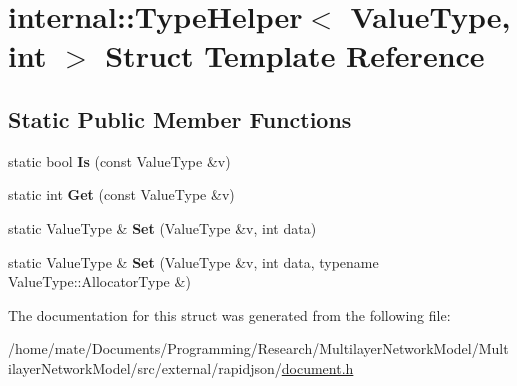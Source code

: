 \hypertarget{structinternal_1_1TypeHelper_3_01ValueType_00_01int_01_4}{}\section{internal\+:\+:Type\+Helper$<$ Value\+Type, int $>$ Struct Template Reference}
\label{structinternal_1_1TypeHelper_3_01ValueType_00_01int_01_4}
\subsection*{Static Public Member Functions}
\begin{DoxyCompactItemize}
\item 
static bool {\bfseries Is} (const Value\+Type \&v)\hypertarget{structinternal_1_1TypeHelper_3_01ValueType_00_01int_01_4_aa17ef940501aac12fd7934ef979c607e}{}\label{structinternal_1_1TypeHelper_3_01ValueType_00_01int_01_4_aa17ef940501aac12fd7934ef979c607e}

\item 
static int {\bfseries Get} (const Value\+Type \&v)\hypertarget{structinternal_1_1TypeHelper_3_01ValueType_00_01int_01_4_a98c331ac026873b9ad4ba68e7bf28446}{}\label{structinternal_1_1TypeHelper_3_01ValueType_00_01int_01_4_a98c331ac026873b9ad4ba68e7bf28446}

\item 
static Value\+Type \& {\bfseries Set} (Value\+Type \&v, int data)\hypertarget{structinternal_1_1TypeHelper_3_01ValueType_00_01int_01_4_aceea0a0fac6684e53a9d9f66da4154cd}{}\label{structinternal_1_1TypeHelper_3_01ValueType_00_01int_01_4_aceea0a0fac6684e53a9d9f66da4154cd}

\item 
static Value\+Type \& {\bfseries Set} (Value\+Type \&v, int data, typename Value\+Type\+::\+Allocator\+Type \&)\hypertarget{structinternal_1_1TypeHelper_3_01ValueType_00_01int_01_4_a2ca21bedcaeaf0fffe913edb2fe1a66a}{}\label{structinternal_1_1TypeHelper_3_01ValueType_00_01int_01_4_a2ca21bedcaeaf0fffe913edb2fe1a66a}

\end{DoxyCompactItemize}


The documentation for this struct was generated from the following file\+:\begin{DoxyCompactItemize}
\item 
/home/mate/\+Documents/\+Programming/\+Research/\+Multilayer\+Network\+Model/\+Multilayer\+Network\+Model/src/external/rapidjson/\hyperlink{document_8h}{document.\+h}\end{DoxyCompactItemize}
